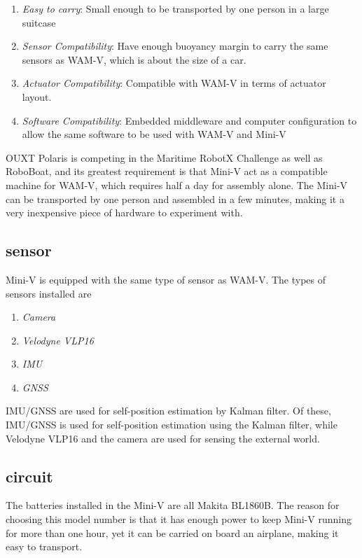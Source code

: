\documentclass[lettersize,journal]{IEEEtran}
\begin{document}
\begin{enumerate}
  \item {\it Easy to carry}: 
  Small enough to be transported by one person in a large suitcase
    
  \item {\it Sensor Compatibility}: 
  Have enough buoyancy margin to carry the same sensors as WAM-V, which is about the size of a car.

  \item {\it Actuator Compatibility}: 
  Compatible with WAM-V in terms of actuator layout.
  
  \item {\it Software Compatibility}: 
  Embedded middleware and computer configuration to allow the same software to be used with WAM-V and Mini-V
\end{enumerate}

OUXT Polaris is competing in the Maritime RobotX Challenge as well as RoboBoat, and its greatest requirement is that Mini-V act as a compatible machine for WAM-V, which requires half a day for assembly alone.
The Mini-V can be transported by one person and assembled in a few minutes, making it a very inexpensive piece of hardware to experiment with.

\subsection{sensor}

Mini-V is equipped with the same type of sensor as WAM-V.
The types of sensors installed are

\begin{enumerate}
  \item {\it Camera}
  \item {\it Velodyne VLP16}
  \item {\it IMU} 
  \item {\it GNSS}
\end{enumerate}

IMU/GNSS are used for self-position estimation by Kalman filter.
Of these, IMU/GNSS is used for self-position estimation using the Kalman filter, while Velodyne VLP16 and the camera are used for sensing the external world.

\subsection{circuit}

The batteries installed in the Mini-V are all Makita BL1860B.
The reason for choosing this model number is that it has enough power to keep Mini-V running for more than one hour, yet it can be carried on board an airplane, making it easy to transport.
\end{document}
